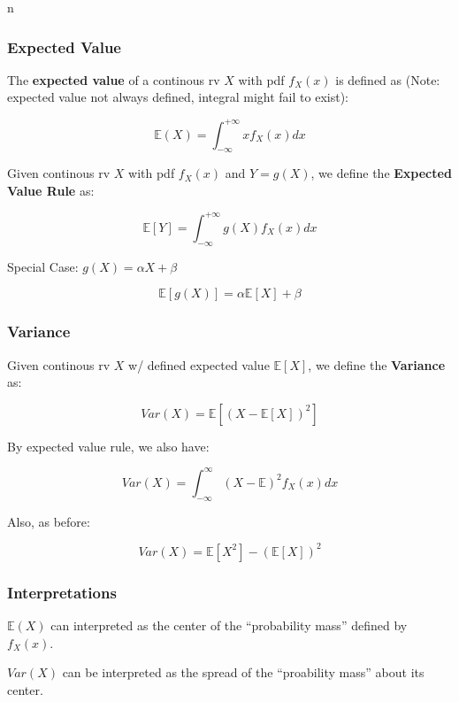 n\documentclass{article}
\begin{document}
\subsubsection{Expected Value}

The \textbf{expected value} of a continous rv $X$ with pdf $f_X(x)$ is
defined as (Note: expected value not always defined, integral might
fail to exist):

\begin{equation}
  \tag{Expected Value: Continous rv}
  \boxed{
    \mathbb{E}(X) = \int_{-\infty}^{+\infty} xf_X(x)dx
  }
\end{equation}

Given continous rv $X$ with pdf $f_X(x)$ and $Y=g(X)$, we define the
\textbf{Expected Value Rule} as:

\begin{equation}
  \tag{Expected Value Rule}
  \boxed{
    \mathbb{E}[Y] = \int_{-\infty}^{+\infty} g(X) f_X(x) dx
  }
\end{equation}

Special Case: $g(X) = \alpha X + \beta$

\[
  \mathbb{E}[g(X)] = \alpha \mathbb{E}[X] + \beta
\]

\subsubsection{Variance}

Given continous rv $X$ w/ defined expected value $\mathbb{E}[X]$, we
define the \textbf{Variance} as:

\begin{equation}
  \tag{Variance: Continous rv}
  \boxed{
    Var(X) = \mathbb{E}[(X - \mathbb{E}[X])^2]
  }
\end{equation}

By expected value rule, we also have:

\[
  Var(X) = \int_{-\infty}^\infty (X - \mathbb{E})^2 f_X(x) dx
\]

Also, as before:

\[
  Var(X) = \mathbb{E}[X^2] - (\mathbb{E}[X])^2
\]

\subsubsection{Interpretations}

$\mathbb{E}(X)$ can interpreted as the center of the ``probability
mass'' defined by $f_X(x)$.

$Var(X)$ can be interpreted as the spread of the ``proability mass''
about its center.
\end{document}
